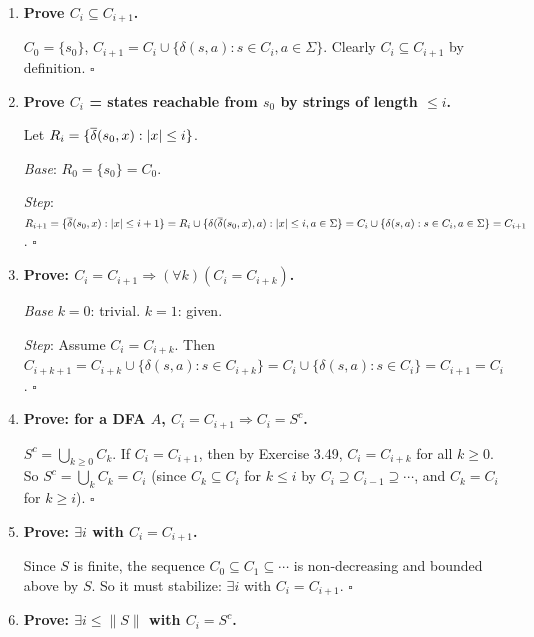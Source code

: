 \begin{enumerate}[{3.}1.]
\begin{enumerate}
\item True: if $A\cong B$ then in particular $L(A)=L(B)$ (by Exercise 3.11).
\end{enumerate}

\item \textbf{Prove $C_i\subseteq C_{i+1}$.}

$C_0=\{s_0\}$, $C_{i+1}=C_i\cup\{\delta(s,a):s\in C_i,a\in\Sigma\}$. Clearly $C_i\subseteq C_{i+1}$ by definition. $\square$

\item \textbf{Prove $C_i$ = states reachable from $s_0$ by strings of length $\leq i$.}

Let $R_i=\{\overline{\delta}(s_0,x):|x|\leq i\}$.

\textit{Base}: $R_0=\{s_0\}=C_0$. \checkmark

\textit{Step}: $R_{i+1}=\{\overline{\delta}(s_0,x):|x|\leq i+1\}=R_i\cup\{\delta(\overline{\delta}(s_0,x),a):|x|\leq i,a\in\Sigma\}=C_i\cup\{\delta(s,a):s\in C_i,a\in\Sigma\}=C_{i+1}$. $\square$

\item \textbf{Prove: $C_i=C_{i+1}\Rightarrow(\forall k)(C_i=C_{i+k})$.}

\textit{Base} $k=0$: trivial. $k=1$: given.

\textit{Step}: Assume $C_i=C_{i+k}$. Then $C_{i+k+1}=C_{i+k}\cup\{\delta(s,a):s\in C_{i+k}\}=C_i\cup\{\delta(s,a):s\in C_i\}=C_{i+1}=C_i$. $\square$

\item \textbf{Prove: for a DFA $A$, $C_i=C_{i+1}\Rightarrow C_i=S^c$.}

$S^c=\bigcup_{k\geq 0}C_k$. If $C_i=C_{i+1}$, then by Exercise 3.49, $C_i=C_{i+k}$ for all $k\geq 0$. So $S^c=\bigcup_k C_k=C_i$ (since $C_k\subseteq C_i$ for $k\leq i$ by $C_i\supseteq C_{i-1}\supseteq\cdots$, and $C_k=C_i$ for $k\geq i$). $\square$

\item \textbf{Prove: $\exists i$ with $C_i=C_{i+1}$.}

Since $S$ is finite, the sequence $C_0\subseteq C_1\subseteq\cdots$ is non-decreasing and bounded above by $S$. So it must stabilize: $\exists i$ with $C_i=C_{i+1}$. $\square$

\item \textbf{Prove: $\exists i\leq\|S\|$ with $C_i=S^c$.}


\end{enumerate}
